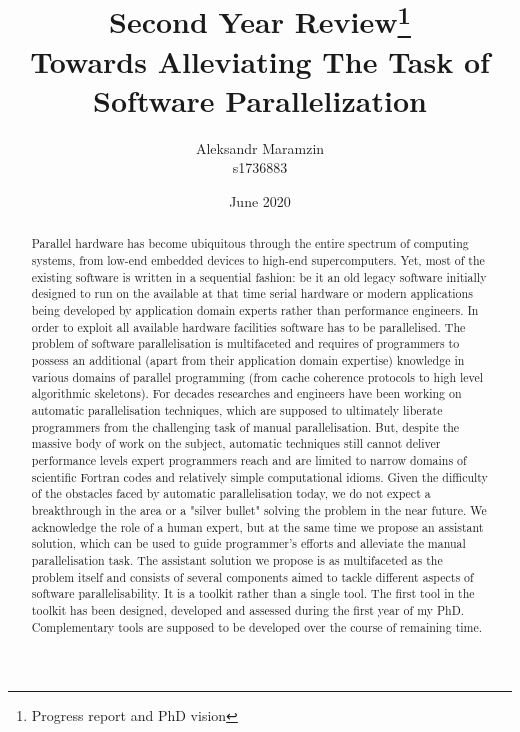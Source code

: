 \documentclass[10pt,a4paper]{report}
\title{\centering \textbf{Second Year Review\thanks{Progress report and PhD vision}}\\Towards Alleviating The Task of Software Parallelization}
\author{Aleksandr Maramzin\\s1736883}
\date{June 2020}
\begin{document}
\maketitle

\begin{abstract}


\quad Parallel hardware has become ubiquitous through the entire spectrum of computing systems, from low-end embedded devices to high-end supercomputers. Yet, most of the existing software is written in a sequential fashion: be it an old legacy software initially designed to run on the available at that time serial hardware or modern applications being developed by application domain experts rather than performance engineers. In order to exploit all available hardware facilities software has to be parallelised.\newline\null
\quad The problem of software parallelisation is multifaceted and requires of programmers to possess an additional (apart from their application domain expertise) knowledge in various domains of parallel programming (from cache coherence protocols to high level algorithmic skeletons). For decades researches and engineers have been working on automatic parallelisation techniques, which are supposed to ultimately liberate programmers from the challenging task of manual parallelisation. But, despite the massive body of work on the subject, automatic techniques still cannot deliver performance levels expert programmers reach and are limited to narrow domains of scientific Fortran codes and relatively simple computational idioms.\newline\null
\quad Given the difficulty of the obstacles faced by automatic parallelisation today, we do not expect a breakthrough in the area or a "silver bullet" solving the problem in the near future. We acknowledge the role of a human expert, but at the same time we propose an assistant solution, which can be used to guide programmer's efforts and alleviate the manual parallelisation task.\newline\null
\quad The assistant solution we propose is as multifaceted as the problem itself and consists of several components aimed to tackle different aspects of software parallelisability. It is a toolkit rather than a single tool. The first tool in the toolkit has been designed, developed and assessed during the first year of my PhD. Complementary tools are supposed to be developed over the course of remaining time.\newline\null

\end{abstract}
\end{document}
